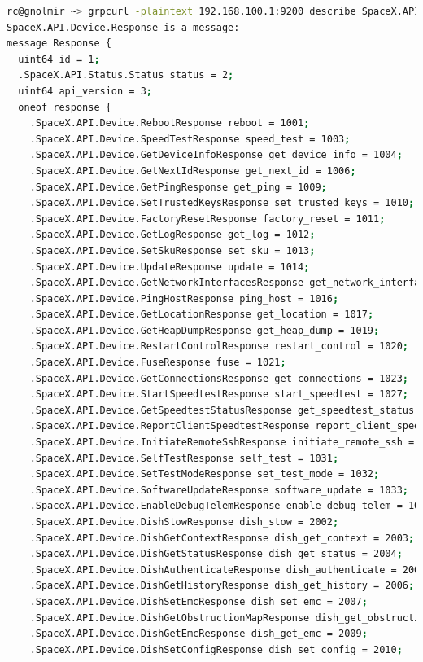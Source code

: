 \documentclass[IN,11pt,twoside,openright,idp,english]{tumthesis}
\begin{document}
\begin{lstlisting}[language=bash,basicstyle=\tiny]
rc@gnolmir ~> grpcurl -plaintext 192.168.100.1:9200 describe SpaceX.API.Device.Response
SpaceX.API.Device.Response is a message:
message Response {
  uint64 id = 1;
  .SpaceX.API.Status.Status status = 2;
  uint64 api_version = 3;
  oneof response {
    .SpaceX.API.Device.RebootResponse reboot = 1001;
    .SpaceX.API.Device.SpeedTestResponse speed_test = 1003;
    .SpaceX.API.Device.GetDeviceInfoResponse get_device_info = 1004;
    .SpaceX.API.Device.GetNextIdResponse get_next_id = 1006;
    .SpaceX.API.Device.GetPingResponse get_ping = 1009;
    .SpaceX.API.Device.SetTrustedKeysResponse set_trusted_keys = 1010;
    .SpaceX.API.Device.FactoryResetResponse factory_reset = 1011;
    .SpaceX.API.Device.GetLogResponse get_log = 1012;
    .SpaceX.API.Device.SetSkuResponse set_sku = 1013;
    .SpaceX.API.Device.UpdateResponse update = 1014;
    .SpaceX.API.Device.GetNetworkInterfacesResponse get_network_interfaces = 1015;
    .SpaceX.API.Device.PingHostResponse ping_host = 1016;
    .SpaceX.API.Device.GetLocationResponse get_location = 1017;
    .SpaceX.API.Device.GetHeapDumpResponse get_heap_dump = 1019;
    .SpaceX.API.Device.RestartControlResponse restart_control = 1020;
    .SpaceX.API.Device.FuseResponse fuse = 1021;
    .SpaceX.API.Device.GetConnectionsResponse get_connections = 1023;
    .SpaceX.API.Device.StartSpeedtestResponse start_speedtest = 1027;
    .SpaceX.API.Device.GetSpeedtestStatusResponse get_speedtest_status = 1028;
    .SpaceX.API.Device.ReportClientSpeedtestResponse report_client_speedtest = 1029;
    .SpaceX.API.Device.InitiateRemoteSshResponse initiate_remote_ssh = 1030 [deprecated = true];
    .SpaceX.API.Device.SelfTestResponse self_test = 1031;
    .SpaceX.API.Device.SetTestModeResponse set_test_mode = 1032;
    .SpaceX.API.Device.SoftwareUpdateResponse software_update = 1033;
    .SpaceX.API.Device.EnableDebugTelemResponse enable_debug_telem = 1034;
    .SpaceX.API.Device.DishStowResponse dish_stow = 2002;
    .SpaceX.API.Device.DishGetContextResponse dish_get_context = 2003;
    .SpaceX.API.Device.DishGetStatusResponse dish_get_status = 2004;
    .SpaceX.API.Device.DishAuthenticateResponse dish_authenticate = 2005;
    .SpaceX.API.Device.DishGetHistoryResponse dish_get_history = 2006;
    .SpaceX.API.Device.DishSetEmcResponse dish_set_emc = 2007;
    .SpaceX.API.Device.DishGetObstructionMapResponse dish_get_obstruction_map = 2008;
    .SpaceX.API.Device.DishGetEmcResponse dish_get_emc = 2009;
    .SpaceX.API.Device.DishSetConfigResponse dish_set_config = 2010;

\end{lstlisting}
\end{document}

